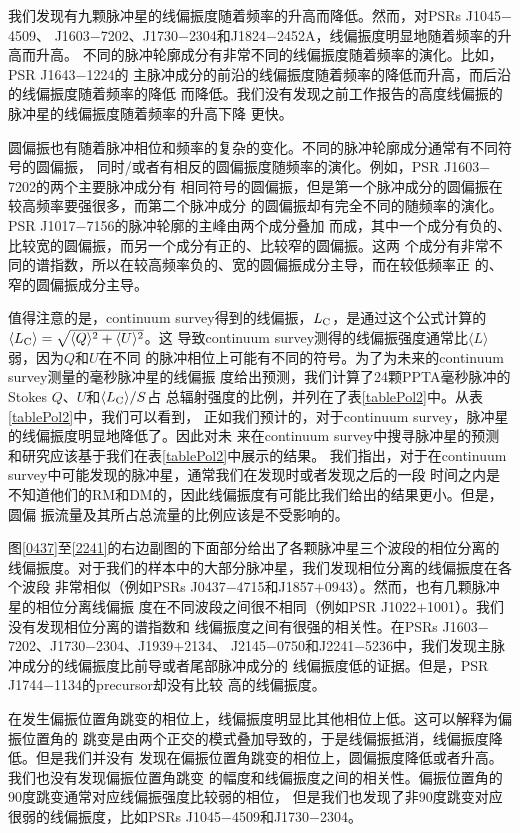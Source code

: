 我们发现有九颗脉冲星的线偏振度随着频率的升高而降低。然而，对PSRs J1045$-$4509、
J1603$-$7202、J1730$-$2304和J1824$-$2452A，线偏振度明显地随着频率的升高而升高。
不同的脉冲轮廓成分有非常不同的线偏振度随着频率的演化。比如，PSR J1643$-$1224的
主脉冲成分的前沿的线偏振度随着频率的降低而升高，而后沿的线偏振度随着频率的降低
而降低。我们没有发现之前工作报告的高度线偏振的脉冲星的线偏振度随着频率的升高下降
更快\supercite{Kramer99}。

圆偏振也有随着脉冲相位和频率的复杂的变化。不同的脉冲轮廓成分通常有不同符号的圆偏振，
同时/或者有相反的圆偏振度随频率的演化。例如，PSR J1603$-$7202的两个主要脉冲成分有
相同符号的圆偏振，但是第一个脉冲成分的圆偏振在较高频率要强很多，而第二个脉冲成分
的圆偏振却有完全不同的随频率的演化。PSR J1017$-$7156的脉冲轮廓的主峰由两个成分叠加
而成，其中一个成分有负的、比较宽的圆偏振，而另一个成分有正的、比较窄的圆偏振。这两
个成分有非常不同的谱指数，所以在较高频率负的、宽的圆偏振成分主导，而在较低频率正
的、窄的圆偏振成分主导。

值得注意的是，continuum survey得到的线偏振，$L_{\rm{C}}$，是通过这个公式计算的
$\langle L_{\rm{C}}\rangle = \sqrt{\langle Q\rangle^{2}+\langle U\rangle^{2}}$。这
导致continuum survey测得的线偏振强度通常比$\langle L\rangle$弱，因为$Q$和$U$在不同
的脉冲相位上可能有不同的符号。为了为未来的continuum survey测量的毫秒脉冲星的线偏振
度给出预测，我们计算了24颗PPTA毫秒脉冲的Stokes $Q$、$U$和$\langle L_{\rm{C}} \rangle/S$占
总辐射强度的比例，并列在了表\ref{tablePol2}中。从表\ref{tablePol2}中，我们可以看到，
正如我们预计的，对于continuum survey，脉冲星的线偏振度明显地降低了。因此对未
来在continuum survey中搜寻脉冲星的预测和研究应该基于我们在表\ref{tablePol2}中展示的结果。
我们指出，对于在continuum survey中可能发现的脉冲星，通常我们在发现时或者发现之后的一段
时间之内是不知道他们的RM和DM的，因此线偏振度有可能比我们给出的结果更小。但是，圆偏
振流量及其所占总流量的比例应该是不受影响的。

图\ref{0437}至\ref{2241}的右边副图的下面部分给出了各颗脉冲星三个波段的相位分离的
线偏振度。对于我们的样本中的大部分脉冲星，我们发现相位分离的线偏振度在各个波段
非常相似（例如PSRs J0437$-$4715和J1857$+$0943）。然而，也有几颗脉冲星的相位分离线偏振
度在不同波段之间很不相同（例如PSR J1022$+$1001）。我们没有发现相位分离的谱指数和
线偏振度之间有很强的相关性。在PSRs J1603$-$7202、J1730$-$2304、J1939$+$2134、
J2145$-$0750和J2241$-$5236中，我们发现主脉冲成分的线偏振度比前导或者尾部脉冲成分的
线偏振度低的证据\supercite{Basu15}。但是，PSR J1744$-$1134的precursor却没有比较
高的线偏振度。

在发生偏振位置角跳变的相位上，线偏振度明显比其他相位上低。这可以解释为偏振位置角的
跳变是由两个正交的模式叠加导致的，于是线偏振抵消，线偏振度降低。但是我们并没有
发现在偏振位置角跳变的相位上，圆偏振度降低或者升高。我们也没有发现偏振位置角跳变
的幅度和线偏振度之间的相关性。偏振位置角的90度跳变通常对应线偏振强度比较弱的相位，
但是我们也发现了非90度跳变对应很弱的线偏振度，比如PSRs J1045$-$4509和J1730$-$2304。

